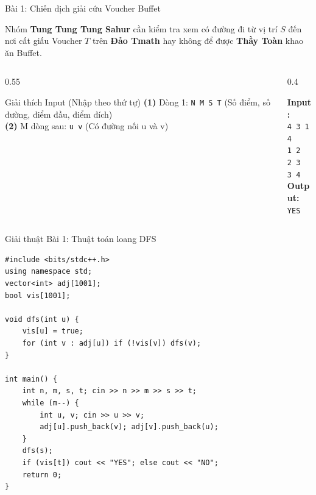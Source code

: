 \documentclass[10pt, xcolor={dvipsnames}]{beamer}
\begin{document}
\begin{frame}{Bài 1: Chiến dịch giải cứu Voucher Buffet}
    \begin{tcolorbox}[colback=mainblue!5, colframe=mainblue, title=\textbf{Cốt truyện phiêu lưu}]
        \scriptsize 
        Nhóm \textbf{Tung Tung Tung Sahur} cần kiểm tra xem có đường đi từ vị trí $S$ đến nơi cất giấu Voucher $T$ trên \textbf{Đảo Tmath} hay không để được \textbf{Thầy Toàn} khao ăn Buffet.
    \end{tcolorbox}

    \begin{columns}[T]
        \begin{column}{0.55\textwidth}
            \begin{block}{\scriptsize Giải thích Input (Nhập theo thứ tự)}
                \tiny 
                \textbf{(1)} Dòng 1: \texttt{N M S T} (Số điểm, số đường, điểm đầu, điểm đích)\\
                \textbf{(2)} M dòng sau: \texttt{u v} (Có đường nối u và v)
            \end{block}
        \end{column}

        \begin{column}{0.4\textwidth}
            \begin{tcolorbox}[colback=white, colframe=mainblue, title=\tiny Sample Test, arc=0mm]
                \tiny
                \textbf{Input:}\\
                \texttt{4 3 1 4}\\
                \texttt{1 2}\\
                \texttt{2 3}\\
                \texttt{3 4}\\
                \vspace{0.1cm}
                \textbf{Output:}\\
                \texttt{YES}
            \end{tcolorbox}
        \end{column}
    \end{columns}
\end{frame}

\begin{frame}[fragile]{Giải thuật Bài 1: Thuật toán loang DFS}
\begin{lstlisting}
#include <bits/stdc++.h>
using namespace std;
vector<int> adj[1001]; 
bool vis[1001];

void dfs(int u) {
    vis[u] = true;
    for (int v : adj[u]) if (!vis[v]) dfs(v);
}

int main() {
    int n, m, s, t; cin >> n >> m >> s >> t;
    while (m--) {
        int u, v; cin >> u >> v;
        adj[u].push_back(v); adj[v].push_back(u);
    }
    dfs(s); 
    if (vis[t]) cout << "YES"; else cout << "NO";
    return 0;
}
\end{lstlisting}
\end{frame}
\end{document}
